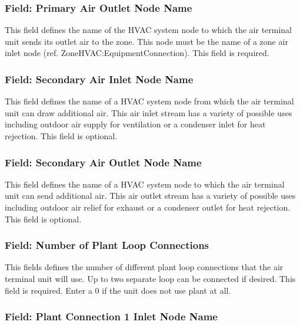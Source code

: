 \subsubsection{Field: Primary Air Outlet Node Name}\label{field-primary-air-outlet-node-name-1-000}

This field defines the name of the HVAC system node to which the air terminal unit sends its outlet air to the zone. This node must be the name of a zone air inlet node (ref. ZoneHVAC:EquipmentConnection). This field is required.

\subsubsection{Field: Secondary Air Inlet Node Name}\label{field-secondary-air-inlet-node-name-1-001}

This field defines the name of a HVAC system node from which the air terminal unit can draw additional air. This air inlet stream has a variety of possible uses including outdoor air supply for ventilation or a condenser inlet for heat rejection. This field is optional.

\subsubsection{Field: Secondary Air Outlet Node Name}\label{field-secondary-air-outlet-node-name-1}

This field defines the name of a HVAC system node to which the air terminal unit can send additional air. This air outlet stream has a variety of possible uses including outdoor air relief for exhaust or a condenser outlet for heat rejection. This field is optional.

\subsubsection{Field: Number of Plant Loop Connections}\label{field-number-of-plant-loop-connections-1}

This fields defines the number of different plant loop connections that the air terminal unit will use. Up to two separate loop can be connected if desired. This field is required. Enter a 0 if the unit does not use plant at all.

\subsubsection{Field: Plant Connection 1 Inlet Node Name}\label{field-plant-connection-1-inlet-node-name-1}


